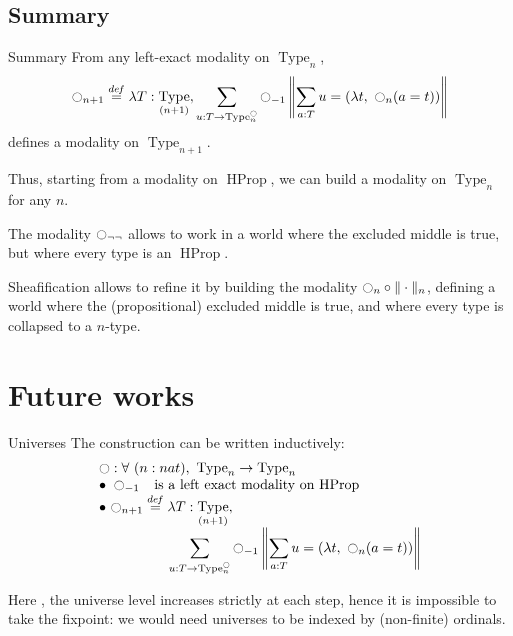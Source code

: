 \documentclass{beamer}
\newcommand \defeq {\overset{de\hspace{-0.2ex}f}{=}}
\DeclareMathOperator{\Type}{Type}
\DeclareMathOperator{\HProp}{HProp}
\newcommand{\modal}{\ensuremath{\ocircle}}
\newcommand{\nType}[1]{\Type_{#1}}
\begin{document}
\subsection{Summary}
\label{sec:consequences}

\begin{frame}{Summary}
  From any left-exact modality on $\Type_n$,
  \[\displaystyle{\modal_{n+1} \defeq  \lambda T:\nType {(n+1)}},
  \sum_{u:T \to \nType n^\modal} \modal_{-1} 
  \left\|
    \sum_{a:T} u= (\lambda t,~\modal_n (a=t))
  \right\|\]
  defines a modality on $\Type_{n+1}$.

  \bigskip

  Thus, starting from a modality on $\HProp$, we can build a modality
  on $\Type_n$ for any $n$.
\end{frame}

\begin{frame}

  \note{ }
  The modality $\modal_{\lnot\lnot}$ allows to work in a world where the
  excluded middle is true, but where every type is an $\HProp$.

  \bigskip

  Sheafification allows to refine it by building the modality $\modal_n \circ \|\cdot
  \|_n$, defining a world where the (propositional) excluded middle is true, and
  where every type is collapsed to a $n$-type.


\end{frame}

\section{Future works}
\label{sec:fw}
\begin{frame}{Universes}
  The construction can be written inductively:
  \[ \begin{array}{l}
    \modal : \forall \ (n : nat), \ \nType n \to \nType n 
    \\
    \bullet~\modal_{-1\phantom{n}} \text{ is a left exact modality on
      $\HProp$} \\
    \bullet~\displaystyle{\modal_{n+1} \defeq  \lambda T:\nType {(n+1)}},\\
    \hspace{5em} \displaystyle{\sum_{u:T \to \nType n^\modal} \modal_{-1} 
      \left\|
        \sum_{a:T} u= (\lambda t,~\modal_n (a=t))
      \right\|}
  \end{array}
  \]

  Here , the universe level increases strictly at each step, hence it is
  impossible to take the fixpoint: we would need universes to be
  indexed by (non-finite) ordinals.

\end{frame}
\end{document}
